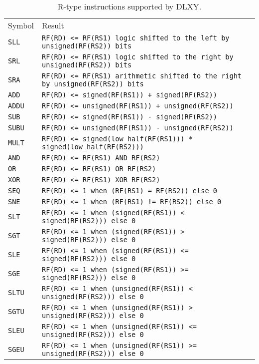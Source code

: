\begin{table}[H]
	\centering
	\begin{tabular}{ll}
		\hline
		\rowcolor{gray!50}
		Symbol & Result \\
		\texttt{SLL} & \texttt{RF(RD) <= RF(RS1) logic shifted to the left by unsigned(RF(RS2)) bits} \\
		\rowcolor{gray!25}
		\texttt{SRL} & \texttt{RF(RD) <= RF(RS1) logic shifted to the right by unsigned(RF(RS2)) bits} \\
		\texttt{SRA} & \texttt{RF(RD) <= RF(RS1) arithmetic shifted to the right by unsigned(RF(RS2)) bits} \\
		\rowcolor{gray!25}
		\texttt{ADD} & \texttt{RF(RD) <= signed(RF(RS1)) + signed(RF(RS2))} \\
		\texttt{ADDU} & \texttt{RF(RD) <= unsigned(RF(RS1)) + unsigned(RF(RS2))} \\
		\rowcolor{gray!25}
		\texttt{SUB} & \texttt{RF(RD) <= signed(RF(RS1)) - signed(RF(RS2))} \\
		\texttt{SUBU} & \texttt{RF(RD) <= unsigned(RF(RS1)) - unsigned(RF(RS2))} \\
		\rowcolor{gray!25}
		\texttt{MULT} & \texttt{RF(RD) <= signed(low\_half(RF(RS1))) * signed(low\_half(RF(RS2)))} \\
		\texttt{AND} & \texttt{RF(RD) <= RF(RS1) AND RF(RS2)} \\
		\rowcolor{gray!25}
		\texttt{OR} & \texttt{RF(RD) <= RF(RS1) OR RF(RS2)} \\
		\texttt{XOR} & \texttt{RF(RD) <= RF(RS1) XOR RF(RS2)} \\
		\rowcolor{gray!25}
		\texttt{SEQ} & \texttt{RF(RD) <= 1 when (RF(RS1) = RF(RS2)) else 0} \\
		\texttt{SNE} & \texttt{RF(RD) <= 1 when (RF(RS1) != RF(RS2)) else 0} \\
		\rowcolor{gray!25}
		\texttt{SLT} & \texttt{RF(RD) <= 1 when (signed(RF(RS1)) < signed(RF(RS2))) else 0} \\
		\texttt{SGT} & \texttt{RF(RD) <= 1 when (signed(RF(RS1)) > signed(RF(RS2))) else 0} \\
		\rowcolor{gray!25}
		\texttt{SLE} & \texttt{RF(RD) <= 1 when (signed(RF(RS1)) <= signed(RF(RS2))) else 0} \\
		\texttt{SGE} & \texttt{RF(RD) <= 1 when (signed(RF(RS1)) >= signed(RF(RS2))) else 0} \\
		\rowcolor{gray!25}
		\texttt{SLTU} & \texttt{RF(RD) <= 1 when (unsigned(RF(RS1)) < unsigned(RF(RS2))) else 0} \\
		\texttt{SGTU} & \texttt{RF(RD) <= 1 when (unsigned(RF(RS1)) > unsigned(RF(RS2))) else 0} \\
		\rowcolor{gray!25}
		\texttt{SLEU} & \texttt{RF(RD) <= 1 when (unsigned(RF(RS1)) <= unsigned(RF(RS2))) else 0} \\
		\texttt{SGEU} & \texttt{RF(RD) <= 1 when (unsigned(RF(RS1)) >= unsigned(RF(RS2))) else 0} \\
		\hline
	\end{tabular}
	\caption{R-type instructions supported by DLXY.}
	\label{tab:r_type_inst}
\end{table}

